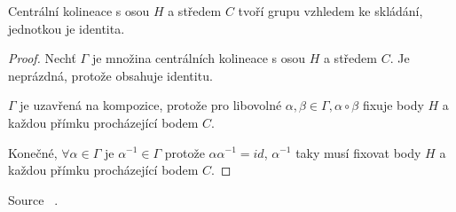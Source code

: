 \begin{lemma}
    Centrální kolineace s osou $H$ a středem $C$ tvoří grupu vzhledem ke skládání, jednotkou je identita.
\end{lemma}
\begin{proof}
	Nechť $\Gamma$ je množina centrálních kolineace s osou $H$ a středem $C$.
	Je neprázdná, protože obsahuje identitu.

	$\Gamma$ je uzavřená na kompozice, protože pro libovolné $\alpha, \beta \in \Gamma, \alpha \circ \beta$ fixuje body $H$ a každou přímku procházející bodem $C$.

	Konečné, $\forall \alpha \in \Gamma$ je $\alpha^{-1} \in \Gamma$ protože $\alpha\alpha^{-1} = id$, $\alpha^{-1}$ taky musí fixovat body $H$ a každou přímku procházející bodem $C$.
\end{proof}
Source ~\cite[p. 96]{beutelspacher1998projective}.

